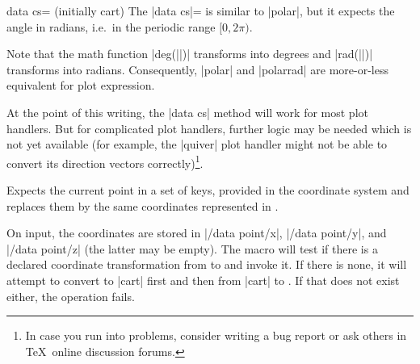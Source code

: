\begin{pgfplotskey}{data cs= (initially cart)}
	The |data cs|= is similar to |polar|, but it expects the angle in radians, i.e.\ in the periodic range $[0,2\pi)$.
\begin{codeexample}[]
\end{codeexample}

	Note that the math function |deg(||)| transforms  into degrees and |rad(||)| transforms  into radians. Consequently, |polar| and |polarrad| are more-or-less equivalent for plot expression.

\begin{codeexample}[]
\end{codeexample}


	At the point of this writing, the |data cs| method will work for most plot handlers. But for complicated plot handlers, further logic may be needed which is not yet available (for example, the |quiver| plot handler might not be able to convert its direction vectors correctly)\footnote{In case you run into problems, consider writing a bug report or ask others in \TeX\ online discussion forums.}.
\end{pgfplotskey}

\begin{command}{\pgfplotsaxistransformcs{}}
	Expects the current point in a set of keys, provided in the coordinate system  and replaces them by the same coordinates represented in .

	On input, the coordinates are stored in |/data point/x|, |/data point/y|, and |/data point/z| (the latter may be empty). The macro will test if there is a declared coordinate transformation from  to  and invoke it. If there is none, it will attempt to convert to |cart| first and then from |cart| to . If that does not exist either, the operation fails.
\end{command}

